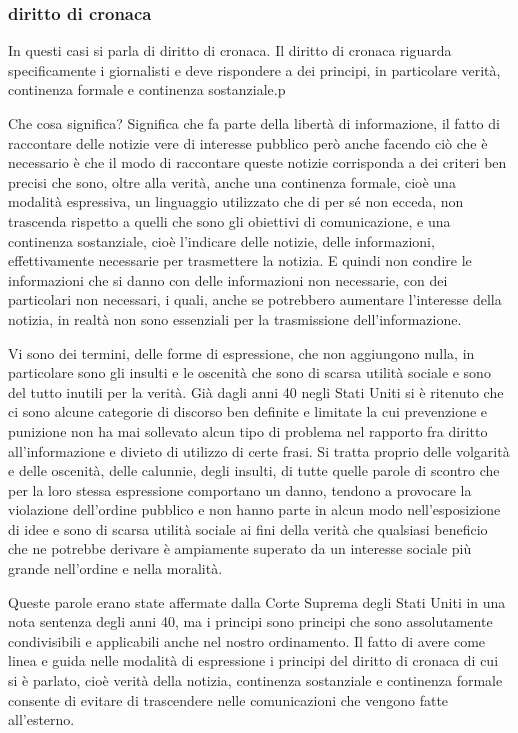  \subsubsection{diritto di cronaca}
 In questi casi si parla di diritto di cronaca. Il diritto di cronaca riguarda specificamente i giornalisti e deve rispondere a dei principi, in particolare verità, continenza formale e continenza sostanziale.p\par
 Che cosa significa? Significa che fa parte della libertà di informazione, il fatto di raccontare delle notizie vere di interesse pubblico però anche facendo ciò che è necessario è che il modo di raccontare queste notizie corrisponda a dei criteri ben precisi che sono, oltre alla verità, anche una continenza formale, cioè una modalità espressiva, un linguaggio utilizzato che di per sé non ecceda, non trascenda rispetto a quelli che sono gli obiettivi di comunicazione, e una continenza sostanziale, cioè l'indicare delle notizie, delle informazioni, effettivamente necessarie per trasmettere la notizia. E quindi non condire le informazioni che si danno con delle informazioni non necessarie, con dei particolari non necessari, i quali, anche se potrebbero aumentare l'interesse della notizia, in realtà non sono essenziali per la trasmissione dell'informazione.\par
 Vi sono dei termini, delle forme di espressione, che non aggiungono nulla, in particolare sono gli insulti e le oscenità che sono di scarsa utilità sociale e sono del tutto inutili per la verità. Già dagli anni 40 negli Stati Uniti si è ritenuto che ci sono alcune categorie di discorso ben definite e limitate la cui prevenzione e punizione non ha mai sollevato alcun tipo di problema nel rapporto fra diritto all'informazione e divieto di utilizzo di certe frasi. Si tratta proprio delle volgarità e delle oscenità, delle calunnie, degli insulti, di tutte quelle parole di scontro che per la loro stessa espressione comportano un danno, tendono a provocare la violazione dell'ordine pubblico e non hanno parte in alcun modo nell'esposizione di idee e sono di scarsa utilità sociale ai fini della verità che qualsiasi beneficio che ne potrebbe derivare è ampiamente superato da un interesse sociale più grande nell'ordine e nella moralità.\par
 Queste parole erano state affermate dalla Corte Suprema degli Stati Uniti in una nota sentenza degli anni 40, ma i principi sono principi che sono assolutamente condivisibili e applicabili anche nel nostro ordinamento. Il fatto di avere come linea e guida nelle modalità di espressione i principi del diritto di cronaca di cui si è parlato, cioè verità della notizia, continenza sostanziale e continenza formale consente di evitare di trascendere nelle comunicazioni che vengono fatte all'esterno.\par
